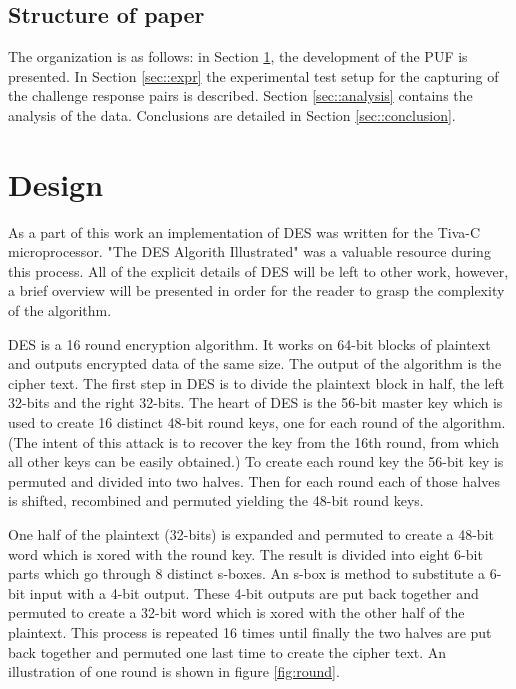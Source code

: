 \subsection{Structure of paper}
	The organization is as follows: in Section \ref{sec::des_impl}, the development of the PUF is presented.  In Section \ref{sec::expr} the experimental test setup for the capturing of the challenge response pairs is described. Section \ref{sec::analysis} contains the analysis of the data. Conclusions are detailed in Section \ref{sec::conclusion}. 


\section{Design} \label{sec::des_impl}
	As a part of this work an implementation of DES was written for the Tiva-C microprocessor.  "The DES Algorith Illustrated" was a valuable resource during this process.  All of the explicit details of DES will be left to other work, however, a brief overview will be presented in order for the reader to grasp the complexity of the algorithm. \cite{des}

	DES is a 16 round encryption algorithm.  It works on 64-bit blocks of plaintext and outputs encrypted data of the same size.  The output of the algorithm is the cipher text.  The first step in DES is to divide the plaintext block in half, the left 32-bits and the right 32-bits.  The heart of DES is the 56-bit master key which is used to create 16 distinct 48-bit round keys, one for each round of the algorithm.  (The intent of this attack is to recover the key from the 16th round, from which all other keys can be easily obtained.)  To create each round key the 56-bit key is permuted and divided into two halves.  Then for each round each of those halves is shifted, recombined and permuted yielding the 48-bit round keys.

	One half of the plaintext (32-bits) is expanded and permuted to create a 48-bit word which is xored with the round key.  The result is divided into eight 6-bit parts which go through 8 distinct s-boxes.  An s-box is  method to substitute a 6-bit input with a 4-bit output.  These 4-bit outputs are put back together and permuted to create a 32-bit word which is xored with the other half of the plaintext.  This process is repeated 16 times until finally the two halves are put back together and permuted one last time to create the cipher text.  An illustration of one round is shown in figure \ref{fig:round}.

